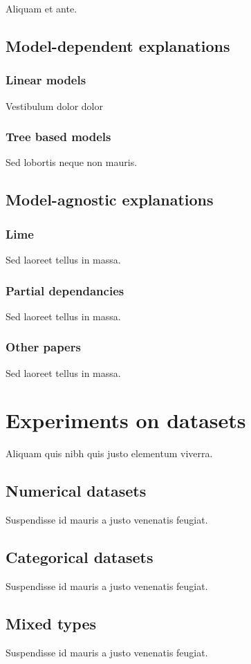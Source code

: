 \documentclass[a4paper,11pt]{kth-mag}
\begin{document}
Aliquam et ante.

\section{Model-dependent explanations}

\subsection{Linear models}

Vestibulum dolor dolor

\subsection{Tree based models}

Sed lobortis neque non mauris.

\section{Model-agnostic explanations}

\subsection{Lime}
Sed laoreet tellus in massa.

\subsection{Partial dependancies}
Sed laoreet tellus in massa.

\subsection{Other papers}
Sed laoreet tellus in massa.

\chapter{Experiments on datasets}
Aliquam quis nibh quis justo elementum viverra.

\section{Numerical datasets}
Suspendisse id mauris a justo venenatis feugiat.

\section{Categorical datasets}
Suspendisse id mauris a justo venenatis feugiat.

\section{Mixed types}
Suspendisse id mauris a justo venenatis feugiat.
\end{document}
